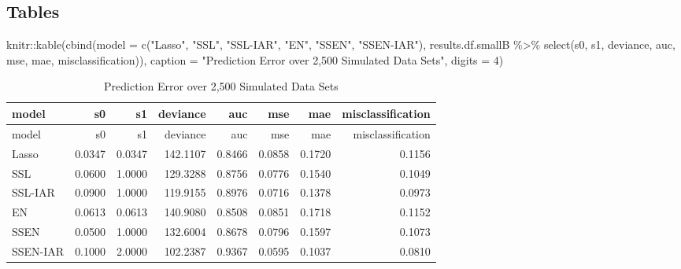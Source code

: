 \documentclass[
]{article}
\newenvironment{Shaded}{\begin{snugshade}}{\end{snugshade}}
\newcommand{\AttributeTok}[1]{\textcolor[rgb]{0.77,0.63,0.00}{#1}}
\newcommand{\DecValTok}[1]{\textcolor[rgb]{0.00,0.00,0.81}{#1}}
\newcommand{\FunctionTok}[1]{\textcolor[rgb]{0.00,0.00,0.00}{#1}}
\newcommand{\NormalTok}[1]{#1}
\newcommand{\SpecialCharTok}[1]{\textcolor[rgb]{0.00,0.00,0.00}{#1}}
\newcommand{\StringTok}[1]{\textcolor[rgb]{0.31,0.60,0.02}{#1}}
\begin{document}
\hypertarget{tables-1}{%
\subsection{Tables}\label{tables-1}}

\begin{Shaded}
\begin{Highlighting}[]
\NormalTok{knitr}\SpecialCharTok{::}\FunctionTok{kable}\NormalTok{(}\FunctionTok{cbind}\NormalTok{(}\AttributeTok{model =} \FunctionTok{c}\NormalTok{(}\StringTok{"Lasso"}\NormalTok{, }\StringTok{"SSL"}\NormalTok{, }\StringTok{"SSL{-}IAR"}\NormalTok{,}
                             \StringTok{"EN"}\NormalTok{, }\StringTok{"SSEN"}\NormalTok{, }\StringTok{"SSEN{-}IAR"}\NormalTok{), }
\NormalTok{                   results.df.smallB }\SpecialCharTok{\%\textgreater{}\%} 
                     \FunctionTok{select}\NormalTok{(s0, s1, deviance, auc, mse, mae, misclassification)),}
             \AttributeTok{caption =} \StringTok{"Prediction Error over 2,500 Simulated Data Sets"}\NormalTok{,}
             \AttributeTok{digits =} \DecValTok{4}\NormalTok{)}
\end{Highlighting}
\end{Shaded}

\begin{longtable}[]{@{}lrrrrrrr@{}}
\caption{Prediction Error over 2,500 Simulated Data Sets}\tabularnewline
\toprule
model & s0 & s1 & deviance & auc & mse & mae & misclassification \\
\midrule
\endfirsthead
\toprule
model & s0 & s1 & deviance & auc & mse & mae & misclassification \\
\midrule
\endhead
Lasso & 0.0347 & 0.0347 & 142.1107 & 0.8466 & 0.0858 & 0.1720 &
0.1156 \\
SSL & 0.0600 & 1.0000 & 129.3288 & 0.8756 & 0.0776 & 0.1540 & 0.1049 \\
SSL-IAR & 0.0900 & 1.0000 & 119.9155 & 0.8976 & 0.0716 & 0.1378 &
0.0973 \\
EN & 0.0613 & 0.0613 & 140.9080 & 0.8508 & 0.0851 & 0.1718 & 0.1152 \\
SSEN & 0.0500 & 1.0000 & 132.6004 & 0.8678 & 0.0796 & 0.1597 & 0.1073 \\
SSEN-IAR & 0.1000 & 2.0000 & 102.2387 & 0.9367 & 0.0595 & 0.1037 &
0.0810 \\
\bottomrule
\end{longtable}
\end{document}
